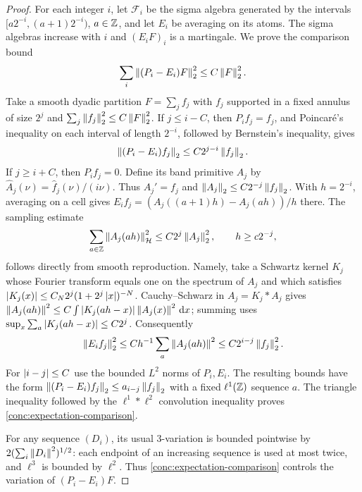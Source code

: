 \begin{proof}
For each integer $i$, let $\mathcal F_i$ be the sigma algebra generated
by the intervals
$[a2^{-i},(a+1)2^{-i})$, $a\in\mathbb Z$, and let $E_i$ be averaging on its
atoms.  The sigma algebras increase with $i$ and $(E_iF)_i$ is a
martingale.  We prove the comparison bound
\begin{equation}\label{conc:expectation-comparison}
 \sum_i\left\|(P_i-E_i)F\right\|_2^2\leq C\left\|F\right\|_2^2.
\end{equation}
Take a smooth dyadic partition $F=\sum_jf_j$ with $f_j$ supported in a
fixed annulus of size $2^j$ and
$\sum_j\left\|f_j\right\|_2^2\leq C\left\|F\right\|_2^2$.
If $j\leq i-C$, then $P_if_j=f_j$, and Poincar\'e's inequality on
each interval of length $2^{-i}$, followed by Bernstein's inequality,
gives
\[
 \left\|(P_i-E_i)f_j\right\|_2\leq C2^{j-i}\left\|f_j\right\|_2.
\]
If $j\geq i+C$, then $P_if_j=0$.  Define its band primitive $A_j$ by
$\widehat A_j(\nu)=\widehat f_j(\nu)/(i\nu)$.  Thus
$A_j'=f_j$ and $\left\|A_j\right\|_2\leq C2^{-j}\left\|f_j\right\|_2$.
With $h=2^{-i}$, averaging on a cell gives
$E_if_j=(A_j((a+1)h)-A_j(ah))/h$ there.
The sampling estimate
\begin{equation}\label{conc:band-sampling}
 \sum_{a\in\mathbb Z}\left\|A_j(ah)\right\|_{\mathcal H}^{2}
 \leq C2^j\left\|A_j\right\|_2^2,\qquad h\geq c2^{-j},
\end{equation}
follows directly from smooth reproduction.  Namely, take a Schwartz
kernel $K_j$ whose Fourier transform equals one on the spectrum of
$A_j$ and which satisfies
$\left|K_j(x)\right|\leq C_N2^j(1+2^j\left|x\right|)^{-N}$.
Cauchy--Schwarz in $A_j=K_j*A_j$ gives
$\left\|A_j(ah)\right\|^2\leq C\int\left|K_j(ah-x)\right|\left\|A_j(x)\right\|^2\,\mathrm d x$;
summing uses $\sup_x\sum_a\left|K_j(ah-x)\right|\leq C2^j$.
Consequently
\[
 \left\|E_if_j\right\|_2^2
 \leq C h^{-1}\sum_a\left\|A_j(ah)\right\|^2
 \leq C2^{i-j}\left\|f_j\right\|_2^2.
\]
For $\left|i-j\right|\leq C$ use the bounded $L^2$ norms of $P_i,E_i$.
The resulting bounds have the form
$\left\|(P_i-E_i)f_j\right\|_2\leq a_{i-j}\left\|f_j\right\|_2$ with a fixed
$\ell^1(\mathbb Z)$ sequence $a$.  The triangle inequality followed by the
$\ell^1*\ell^2$ convolution inequality proves
\eqref{conc:expectation-comparison}.

For any sequence $(D_i)$, its usual $3$-variation is bounded pointwise
by $2(\sum_i\left\|D_i\right\|^2)^{1/2}$: each endpoint of an increasing
sequence is used at most twice, and $\ell^3$ is bounded by $\ell^2$.
Thus \eqref{conc:expectation-comparison} controls the variation of
$(P_i-E_i)F$.


\end{proof}
